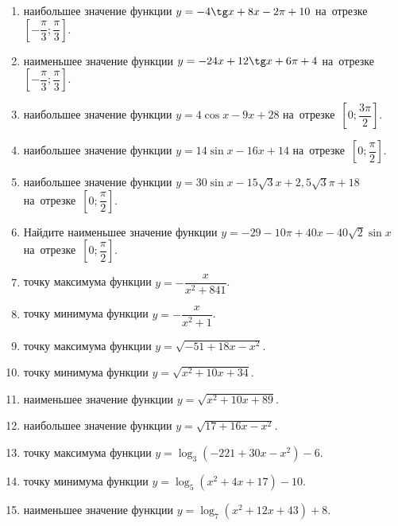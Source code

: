 \documentclass[a4paper,10pt]{article}
\begin{document}
\begin{enumerate}
\item {} наибольшее значение функции $y=-4\tg x +8x-2\pi +10$ на~отрезке~$\left[-\dfrac{\pi}{3};\dfrac{\pi}{3}\right]$.

\item {} наименьшее значение функции $y=-24x +12\tg x+6\pi+4$ на~отрезке~$\left[-\dfrac{\pi}{3};\dfrac{\pi}{3}\right]$.

\item {} наибольшее значение функции $y=4\cos x-9x+28$ на~отрезке~$\left[0;\dfrac{3\pi}{2}\right]$.

\item {} наибольшее значение функции $y=14\sin x-16x+14$ на~отрезке~$\left[0;\dfrac{\pi}{2}\right]$.

\item {} наибольшее значение функции $y=30\sin x-15\sqrt{3}x+2,5\sqrt{3}\pi +18$ на~отрезке~$\left[0;\dfrac{\pi}{2}\right]$.

\item Найдите наименьшее значение функции $y=-29-10\pi+40x-40\sqrt{2}\sin x$ на~отрезке~$\left[0;\dfrac{\pi}{2}\right]$.

\item {} точку максимума функции $y=-\dfrac{x}{ x^2 +841}$.

\item {} точку минимума функции $y=-\dfrac{x}{ x^2 +1}$.

\item {} точку максимума функции $y=\sqrt{-51+18x-x^2}$.

\item {} точку минимума функции $y=\sqrt{x^2+10x+34}$.

\item {} наименьшее значение функции $y=\sqrt{x^2+10x+89}$.

\item {} наибольшее значение функции $y=\sqrt{17+16x-x^2}$.

\item {} точку максимума функции $y=\log_3\left(-221+30x-x^2\right)-6$.

\item {} точку минимума функции $y=\log_5\left(x^2+4x+17\right)-10$.

\item {} наименьшее значение функции $y=\log_7\left(x^2+12x+43\right)+8$.


\end{enumerate}
\end{document}
